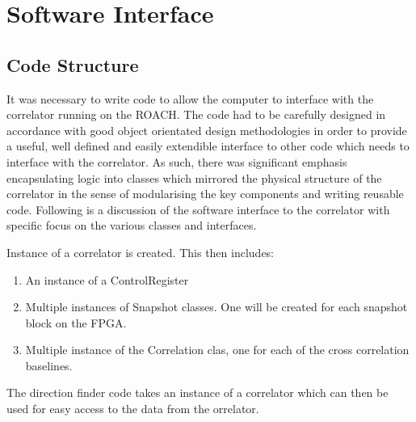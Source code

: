\chapter{Software Interface}
\label{ch:software-design}
\graphicspath{{./img/software/}}


\section{Code Structure}
It was necessary to write code to allow the computer to interface with the correlator running on the ROACH.
The code had to be carefully designed in accordance with good object orientated design methodologies in order to provide a useful, well defined and easily extendible interface to other code which needs to interface with the correlator.
As such, there was significant emphasis encapsulating logic into classes which mirrored the physical structure of the correlator in the sense of modularising the key components and writing reusable code.
Following is a discussion of the software interface to the correlator with specific focus on the various classes and interfaces.

Instance of a correlator is created.
This then includes:
\begin{enumerate}
  \item An instance of a ControlRegister
  \item Multiple instances of Snapshot classes. One will be created for each snapshot block on the FPGA.
  \item Multiple instance of the Correlation clas, one for each of the cross correlation baselines.
\end{enumerate}

The direction finder code takes an instance of a correlator which can then be used for easy access to the data from the orrelator.

